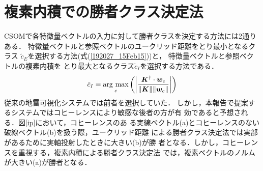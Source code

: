﻿\documentclass[12pt,oneside]{jsbook}
\newcommand{\argmax}{\mathop{\rm arg~max}\limits}
\begin{document}
%
%

\section{複素内積での勝者クラス決定法}
CSOMで各特徴量ベクトルの入力に対して勝者クラスを決定する方法には2通りある．
特徴量ベクトルと参照ベクトルのユークリッド距離をとり最小となるクラス
$\tilde{c}_E$を選択する方法(式(\ref{192027_15Feb15}))と，
特徴量ベクトルと参照ベクトルの複素内積を
とり最大となるクラス$\tilde{c}_I$を選択する方法\cite{2010Yoshida}である．
\begin{eqnarray}
\tilde{c}_I = \argmax_{c} \left( \left|
 \frac{{\bm K}^{\dagger}\cdot{\bm w_c}}{ \|{\bm K}\| \| {\bm w_c} \| }
                                   \right| \right)
\end{eqnarray}
従来の地雷可視化システムでは前者を選択していた．
しかし，本報告で提案するシステムではコヒーレンスにより敏感な後者の方が有
効である\cite{aoyagi}と予想される．図\ref{ip}において，コヒーレンスのあ
る実線ベクトル(a)とコヒーレンスのない破線ベクトル(b)を扱う際，ユークリッド距離
による勝者クラス決定法では実部があるために実軸投射したときに大きい(b)が勝
者となる．しかし，コヒーレンスを重視する，複素内積による勝者クラス決定法
では，複素ベクトルのノルムが大きい(a)が勝者となる．
\end{document}
